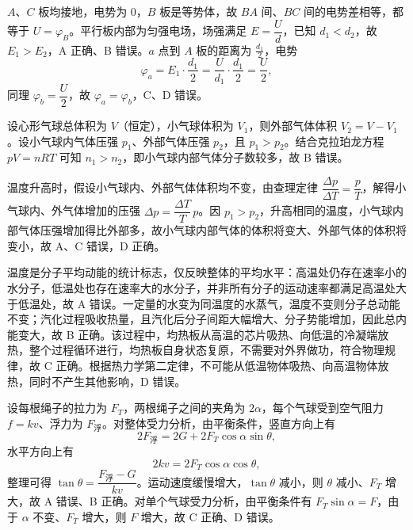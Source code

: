 \begin{answer}
$A$、$C$ 板均接地，电势为 0，$B$ 板是等势体，故 $BA$ 间、$BC$ 间的电势差相等，都等于 $U=\varphi_{B}$。平行板内部为匀强电场，场强满足 $E=\dfrac{U}{d}$，已知 $d_{1}<d_{2}$，故 $E_{1}>E_{2}$，A 正确、B 错误。$a$ 点到 $A$ 板的距离为 $\tfrac{d_{1}}{2}$，电势
\[
  \varphi_{a}=E_{1}\cdot\frac{d_{1}}{2}=\frac{U}{d_{1}}\cdot\frac{d_{1}}{2}=\frac{U}{2},
\]
同理 $\varphi_{b}=\dfrac{U}{2}$，故 $\varphi_{a}=\varphi_{b}$，C、D 错误。
\end{answer}

\begin{answer}
设心形气球总体积为 $V$（恒定），小气球体积为 $V_{1}$，则外部气体体积 $V_{2}=V-V_{1}$。设小气球内气体压强 $p_{1}$、外部气体压强 $p_{2}$，且 $p_{1}>p_{2}$。结合克拉珀龙方程 $pV=nRT$ 可知 $n_{1}>n_{2}$，即小气球内部气体分子数较多，故 B 错误。

温度升高时，假设小气球内、外部气体体积均不变，由查理定律 $\dfrac{\Delta p}{\Delta T}=\dfrac{p}{T}$，解得小气球内、外气体增加的压强 $\Delta p=\dfrac{\Delta T}{T}\,p$。因 $p_{1}>p_{2}$，升高相同的温度，小气球内部气体压强增加得比外部多，故小气球内部气体的体积将变大、外部气体的体积将变小，故 A、C 错误，D 正确。
\end{answer}

\begin{answer}
温度是分子平均动能的统计标志，仅反映整体的平均水平：高温处仍存在速率小的水分子，低温处也存在速率大的水分子，并非所有分子的运动速率都满足高温处大于低温处，故 A 错误。一定量的水变为同温度的水蒸气，温度不变则分子总动能不变；汽化过程吸收热量，且汽化后分子间距大幅增大、分子势能增加，因此总内能变大，故 B 正确。该过程中，均热板从高温的芯片吸热、向低温的冷凝端放热，整个过程循环进行，均热板自身状态复原，不需要对外界做功，符合物理规律，故 C 正确。根据热力学第二定律，不可能从低温物体吸热、向高温物体放热，同时不产生其他影响，D 错误。
\end{answer}

\begin{answer}
设每根绳子的拉力为 $F_{T}$，两根绳子之间的夹角为 $2\alpha$，每个气球受到空气阻力 $f=kv$、浮力为 $F_{\text{浮}}$。对整体受力分析，由平衡条件，竖直方向上有
\[
  2F_{\text{浮}}=2G+2F_{T}\cos\alpha\sin\theta,
\]
水平方向上有
\[
  2kv=2F_{T}\cos\alpha\cos\theta,
\]
整理可得 $\tan\theta=\dfrac{F_{\text{浮}}-G}{kv}$。运动速度缓慢增大，$\tan\theta$ 减小，则 $\theta$ 减小、$F_{T}$ 增大，故 A 错误、B 正确。对单个气球受力分析，由平衡条件有 $F_{T}\sin\alpha=F$，由于 $\alpha$ 不变、$F_{T}$ 增大，则 $F$ 增大，故 C 正确、D 错误。
\end{answer}

